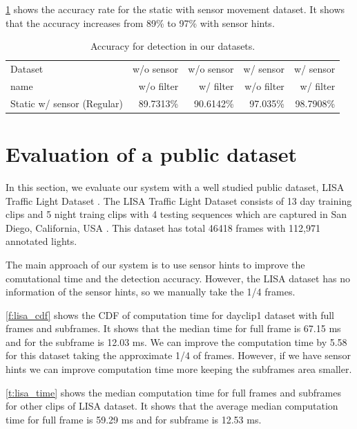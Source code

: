 \ref{t:acc_stat} shows the accuracy rate for the static with sensor movement dataset.
It shows that the accuracy increases from 89\% to 97\% with sensor hints.

\begin{table}[h!]
  \centering
  \caption{Accuracy for detection in our datasets.}
  \label{t:acc_stat}
  \begin{tabular}{  l  r  r r r }
    \rowcolor{gray!50}
    Dataset & w/o sensor & w/o sensor & w/ sensor & w/ sensor \\
    \rowcolor{gray!50}
    name & w/o filter & w/ filter & w/o filter & w/ filter \\
    \hline
    Static w/ sensor (Regular) & 89.7313\% & 90.6142\% & 97.035\% & 98.7908\% \\
    \hline
  \end{tabular}
\end{table}


\section{Evaluation of a public dataset}

In this section, we evaluate our system with a well studied public dataset, LISA Traffic Light Dataset \cite{lisa}.
The LISA Traffic Light Dataset consists of 13 day training clips and 5 night traing clips with 4 testing sequences which are captured in San Diego, California, USA \cite{lisa2}.
This dataset has total 46418 frames with 112,971 annotated lights.

The main approach of our system is to use sensor hints to improve the comutational time and the detection accuracy.
However, the LISA dataset has no information of the sensor hints, so we manually take the 1/4 frames.

\ref{f:lisa_cdf} shows the CDF of computation time for dayclip1 dataset with full frames and subframes.
It shows that the median time for full frame is 67.15 ms and for the subframe is 12.03 ms.
We can improve the computation time by 5.58 for this dataset taking the approximate 1/4 of frames.
However, if we have sensor hints we can improve computation time more keeping the subframes area smaller.

\ref{t:lisa_time} shows the median computation time for full frames and subframes for other clips of LISA dataset.
It shows that the average median computation time for full frame is 59.29 ms and for subframe is 12.53 ms.


